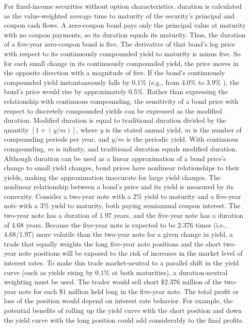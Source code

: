 \documentclass[11pt]{article}
\begin{document}
For fixed-income securities without option characteristics, duration is calculated as the value-weighted average time to maturity of the security's principal and coupon cash flows. A zero-coupon bond pays only the principal value at maturity with no coupon payments, so its duration equals its maturity. Thus, the duration of a five-year zero-coupon bond is five. The derivative of that bond's log price with respect to its continuously compounded yield to maturity is minus five. So for each small change in its continuously compounded yield, the price moves in the opposite direction with a magnitude of five. If the bond's continuously compounded yield instantaneously falls by $0.1 \%$ (e.g., from $4.0 \%$ to $3.9 \%$ ), the bond's price would rise by approximately $0.5 \%$. Rather than expressing the relationship with continuous compounding, the sensitivity of a bond price with respect to discretely compounded yields can be expressed as the modified duration. Modified duration is equal to traditional duration divided by the quantity $[1+(y / m)]$, where $y$ is the stated annual yield, $m$ is the number of compounding periods per year, and $y / m$ is the periodic yield. With continuous compounding, $m$ is infinity, and traditional duration equals modified duration. Although duration can be used as a linear approximation of a bond price's change to small yield changes, bond prices have nonlinear relationships to their yields, making the approximation inaccurate for large yield changes. The nonlinear relationship between a bond's price and its yield is measured by its convexity. Consider a two-year note with a $2 \%$ yield to maturity and a five-year note with a $3 \%$ yield to maturity, both paying semiannual coupon interest. The two-year note has a duration of 1.97 years, and the five-year note has a duration of 4.68 years. Because the five-year note is expected to be 2.376 times (i.e., 4.68/1.97) more volatile than the two-year note for a given change in yield, a trade that equally weights the long five-year note positions and the short two-year note positions will be exposed to the risk of increases in the market level of interest rates. To make this trade market-neutral to a parallel shift in the yield curve (such as yields rising by $0.1 \%$ at both maturities), a duration-neutral weighting must be used. The trader would sell short $\$ 2.376$ million of the two-year note for each $\$ 1$ million held long in the five-year note. The total profit or loss of the position would depend on interest rate behavior. For example, the potential benefits of rolling up the yield curve with the short position and down the yield curve with the long position could add considerably to the final profits.
\end{document}
